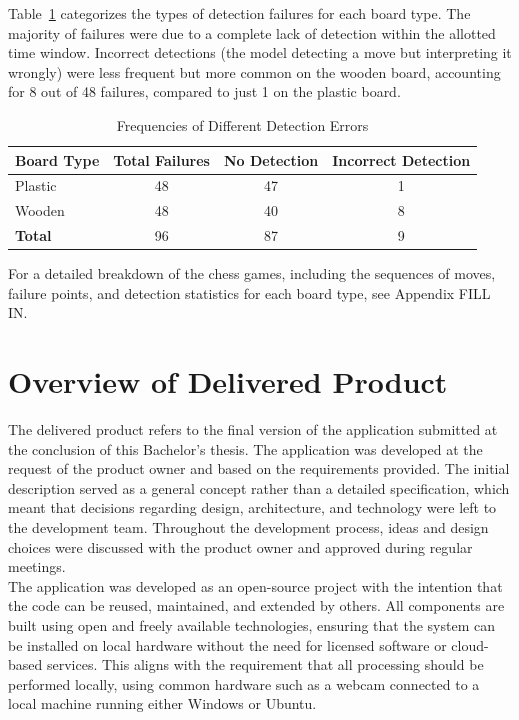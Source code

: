 Table~\ref{tab:different-errors} categorizes the types of detection failures for each board type. The majority of failures were due to a complete lack of detection within the allotted time window. Incorrect detections (the model detecting a move but interpreting it wrongly) were less frequent but more common on the wooden board, accounting for 8 out of 48 failures, compared to just 1 on the plastic board.  \\

\begin{table}[htbp]
\centering
\caption{Frequencies of Different Detection Errors}
\label{tab:different-errors}
\begin{tabular}{lccc}
\toprule
\textbf{Board Type} & \textbf{Total Failures} & \textbf{No Detection} & \textbf{Incorrect Detection} \\
\midrule
Plastic & 48 & 47 & 1 \\
Wooden & 48 & 40 & 8 \\
\midrule
\textbf{Total} & 96 & 87 & 9 \\
\bottomrule
\end{tabular}
\end{table}

For a detailed breakdown of the chess games, including the sequences of moves, failure points, and detection statistics for each board type, see Appendix FILL IN.

\newpage

\section{Overview of Delivered Product}
The delivered product refers to the final version of the application submitted at the conclusion of this Bachelor’s thesis. The application was developed at the request of the product owner and based on the requirements provided. The initial description served as a general concept rather than a detailed specification, which meant that decisions regarding design, architecture, and technology were left to the development team. Throughout the development process, ideas and design choices were discussed with the product owner and approved during regular meetings. \\

The application was developed as an open-source project with the intention that the code can be reused, maintained, and extended by others. All components are built using open and freely available technologies, ensuring that the system can be installed on local hardware without the need for licensed software or cloud-based services. This aligns with the requirement that all processing should be performed locally, using common hardware such as a webcam connected to a local machine running either Windows or Ubuntu. \\

